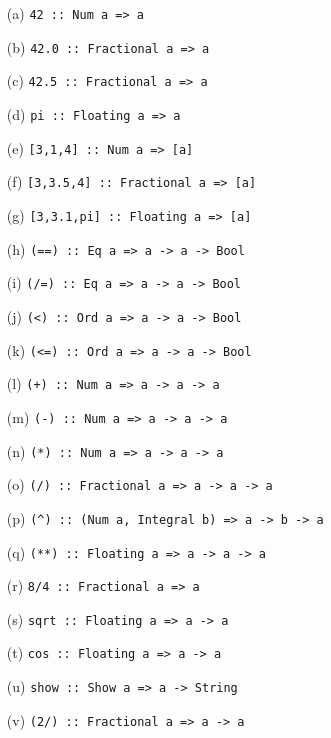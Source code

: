 
\begin{itemize}
    \item[(a)] \verb|42 :: Num a => a|
    \item[(b)] \verb|42.0 :: Fractional a => a|
    \item[(c)] \verb|42.5 :: Fractional a => a|
    \item[(d)] \verb|pi :: Floating a => a|
    \item[(e)] \verb|[3,1,4] :: Num a => [a]|
    \item[(f)] \verb|[3,3.5,4] :: Fractional a => [a]|
    \item[(g)] \verb|[3,3.1,pi] :: Floating a => [a]|
    \item[(h)] \verb|(==) :: Eq a => a -> a -> Bool|
    \item[(i)] \verb|(/=) :: Eq a => a -> a -> Bool|
    \item[(j)] \verb|(<) :: Ord a => a -> a -> Bool|
    \item[(k)] \verb|(<=) :: Ord a => a -> a -> Bool|
    \item[(l)] \verb|(+) :: Num a => a -> a -> a|
    \item[(m)] \verb|(-) :: Num a => a -> a -> a|
    \item[(n)] \verb|(*) :: Num a => a -> a -> a|
    \item[(o)] \verb|(/) :: Fractional a => a -> a -> a|
    \item[(p)] \verb|(^) :: (Num a, Integral b) => a -> b -> a|
    \item[(q)] \verb|(**) :: Floating a => a -> a -> a|
    \item[(r)] \verb|8/4 :: Fractional a => a|
    \item[(s)] \verb|sqrt :: Floating a => a -> a|
    \item[(t)] \verb|cos :: Floating a => a -> a|
    \item[(u)] \verb|show :: Show a => a -> String|
    \item[(v)] \verb|(2/) :: Fractional a => a -> a|
\end{itemize}
